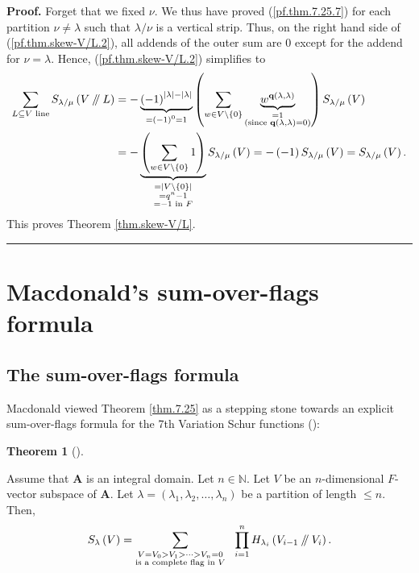 \documentclass[numbers=enddot,12pt,final,onecolumn,notitlepage]{scrartcl}%
\numberwithin{exer}{section}
\theoremstyle{definition}
\newtheorem{theo}{Theorem}[section]
\newenvironment{theorem}[1][]
{\begin{theo}[#1]\begin{leftbar}}
{\end{leftbar}\end{theo}}
\newenvironment{proof}[1][Proof]{\noindent\textbf{#1.} }{\ \rule{0.5em}{0.5em}}
\let\sumnonlimits\sum
\let\prodnonlimits\prod
\renewcommand{\sum}{\sumnonlimits\limits}
\renewcommand{\prod}{\prodnonlimits\limits}
\newcommand{\sslash}{\mathbin{/\mkern-5mu/}}
\theoremstyle{plainsl}
\begin{document}
\begin{proof}
Forget that we fixed $\nu$. We thus have proved (\ref{pf.thm.7.25.7}) for each
partition $\nu\neq\lambda$ such that $\lambda/\nu$ is a vertical strip. Thus,
on the right hand side of (\ref{pf.thm.skew-V/L.2}), all addends of the outer
sum are $0$ except for the addend for $\nu=\lambda$. Hence,
(\ref{pf.thm.skew-V/L.2}) simplifies to
\begin{align*}
\sum_{L\subseteq V\text{ line}}S_{\lambda/\mu}\left(  V\sslash L\right)   &
=-\underbrace{\left(  -1\right)  ^{\left\vert \lambda\right\vert -\left\vert
\lambda\right\vert }}_{=\left(  -1\right)  ^{0}=1}\left(  \sum_{w\in
V\setminus\left\{  0\right\}  }\underbrace{w^{\mathbf{q}\left(  \lambda
,\lambda\right)  }}_{\substack{=1\\\text{(since }\mathbf{q}\left(
\lambda,\lambda\right)  =0\text{)}}}\right)  S_{\lambda/\mu}\left(  V\right)
\\
&  =-\underbrace{\left(  \sum_{w\in V\setminus\left\{  0\right\}  }1\right)
}_{\substack{=\left\vert V\setminus\left\{  0\right\}  \right\vert
\\=q^{n}-1\\=-1\text{ in }F}}S_{\lambda/\mu}\left(  V\right)  =-\left(
-1\right)  S_{\lambda/\mu}\left(  V\right)  =S_{\lambda/\mu}\left(  V\right)
.
\end{align*}
This proves Theorem \ref{thm.skew-V/L}.
\end{proof}

\section{Macdonald's sum-over-flags formula}

\subsection{The sum-over-flags formula}

Macdonald viewed Theorem \ref{thm.7.25} as a stepping stone towards an
explicit sum-over-flags formula for the 7th Variation Schur functions
(\cite[(7.24 ?)]{Macdon92}):

\begin{theorem}
\label{thm.7.24}Assume that $\mathbf{A}$ is an integral domain. Let
$n\in\mathbb{N}$. Let $V$ be an $n$-dimensional $F$-vector subspace of
$\mathbf{A}$. Let $\lambda=\left(  \lambda_{1},\lambda_{2},\ldots,\lambda
_{n}\right)  $ be a partition of length $\leq n$. Then,%
\[
S_{\lambda}\left(  V\right)  =\sum_{\substack{V=V_{0}>V_{1}>\cdots
>V_{n}=0\\\text{is a complete flag in }V}}\ \ \prod_{i=1}^{n}H_{\lambda_{i}%
}\left(  V_{i-1}\sslash V_{i}\right)  .
\]

\end{theorem}
\end{document}
